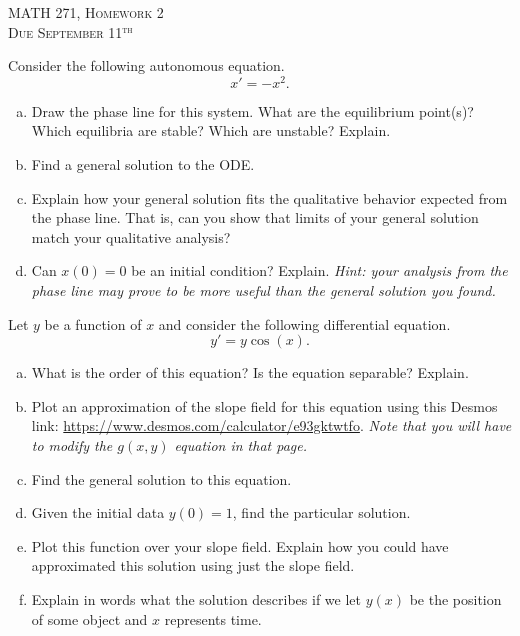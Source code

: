 \documentclass[12pt]{article} %
\begin{document}
\begin{center}
   \textsc{\large MATH 271, Homework 2}\\
   \textsc{Due September 11$^\textrm{th}$}
\end{center}
\vspace{.5cm}


\begin{problem} 
Consider the following autonomous equation.
    \[
    x'=-x^2.
    \]
    \begin{enumerate}[(a)]
        \item Draw the phase line for this system. What are the equilibrium point(s)? Which equilibria are stable? Which are unstable? Explain.
        \item Find a general solution to the ODE.
        \item Explain how your general solution fits the qualitative behavior expected from the phase line. That is, can you show that limits of your general solution match your qualitative analysis?
        \item Can $x(0)=0$ be an initial condition? Explain. \emph{Hint: your analysis from the phase line may prove to be more useful than the general solution you found.}
    \end{enumerate}
\end{problem}


\begin{problem}
Let $y$ be a function of $x$ and consider the following differential equation.
\[
y' = y\cos(x).
\]
\begin{enumerate}[(a)]
    \item What is the order of this equation? Is the equation separable? Explain.
    \item Plot an approximation of the slope field for this equation using this Desmos link: \url{https://www.desmos.com/calculator/e93gktwtfo}. \emph{Note that you will have to modify the $g(x,y)$ equation in that page.}
    \item Find the general solution to this equation.
    \item Given the initial data $y(0)=1$, find the particular solution.
    \item Plot this function over your slope field. Explain how you could have approximated this solution using just the slope field.
    \item Explain in words what the solution describes if we let $y(x)$ be the position of some object and $x$ represents time.
\end{enumerate}
\end{problem}
\end{document}
